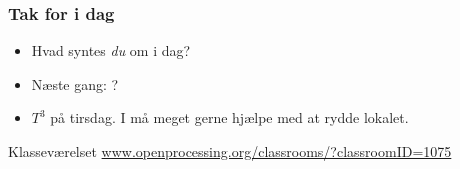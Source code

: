 \documentclass{beamer}
\begin{document}
\begin{frame}
  \frametitle{Tak for i dag}

  \begin{itemize}
  \item Hvad syntes \emph{du} om i dag?
  \item Næste gang: ?
  \item $T^3$ på tirsdag. I må meget gerne hjælpe med at rydde lokalet.
  \end{itemize}

  \begin{block}{Klasseværelset}
    \url{www.openprocessing.org/classrooms/?classroomID=1075}
  \end{block}

\end{frame}
\end{document}
